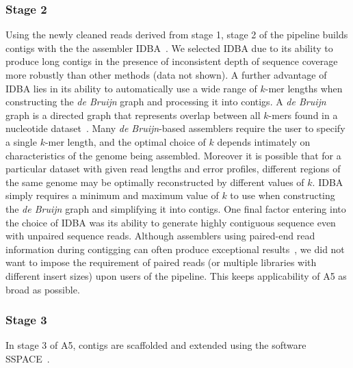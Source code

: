 \documentclass{bioinfo}
\begin{document}
\begin{methods}
\subsubsection{Stage 2}
Using the newly cleaned reads derived from stage 1, stage 2 of the pipeline builds contigs
with the the assembler IDBA~\citep{Peng2010}. We selected IDBA due 
to its ability to produce long contigs in the presence of inconsistent depth of sequence coverage more robustly than other methods (data not shown).
A further advantage of IDBA lies in its ability to automatically use a wide range of $k$-mer lengths when constructing the \emph{de Bruijn} graph 
and processing it into contigs. A \emph{de Bruijn} graph is a directed graph that represents overlap between all $k$-mers found in a nucleotide dataset~\citep{Pop2009}.
Many \emph{de Bruijn}-based assemblers require the user to specify a single $k$-mer length, and the optimal choice of $k$ depends intimately
on characteristics of the genome being assembled.  Moreover it is possible that for a particular dataset with given read lengths and error profiles, 
different regions of the same genome may be optimally reconstructed by different values of $k$. IDBA simply requires a minimum and maximum value of
$k$ to use when constructing the \emph{de Bruijn} graph and simplifying it into contigs. One final factor entering into the choice of IDBA was its 
ability to generate highly contiguous sequence even with unpaired sequence reads. Although assemblers using paired-end read information during 
contigging can often produce exceptional results~\citep{Gnerre2011, SASSY}, we did not want to impose the requirement of paired reads (or multiple
libraries with different insert sizes) upon users of the pipeline. This keeps applicability of A5 as broad as possible.

\subsubsection{Stage 3}
In stage 3 of A5, contigs are scaffolded and extended using the software SSPACE~\citep{Boetzer2011}. %


\end{methods}
\end{document}
